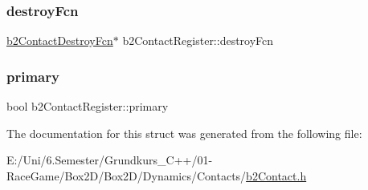 \subsubsection{\texorpdfstring{destroyFcn}{destroyFcn}}
{\footnotesize\ttfamily \mbox{\hyperlink{b2_contact_8h_a13f1fcd7bbd3900e53e6ddf8a76428e7}{b2\+Contact\+Destroy\+Fcn}}$\ast$ b2\+Contact\+Register\+::destroy\+Fcn}

\mbox{\label{structb2_contact_register_a43f2d79909505b785b9034b21a56525e}} 
\subsubsection{\texorpdfstring{primary}{primary}}
{\footnotesize\ttfamily bool b2\+Contact\+Register\+::primary}



The documentation for this struct was generated from the following file\+:\begin{DoxyCompactItemize}
\item 
E\+:/\+Uni/6.\+Semester/\+Grundkurs\+\_\+\+C++/01-\/\+Race\+Game/\+Box2\+D/\+Box2\+D/\+Dynamics/\+Contacts/\mbox{\hyperlink{b2_contact_8h}{b2\+Contact.\+h}}\end{DoxyCompactItemize}
